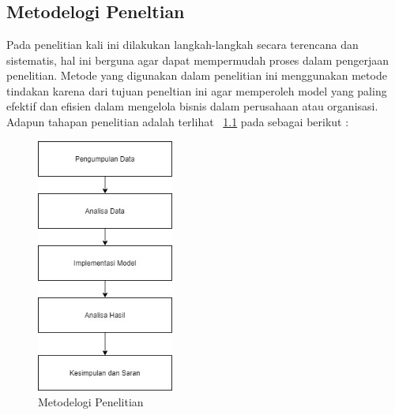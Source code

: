 \chapter{\babTiga}


\section{Metodelogi Peneltian}

Pada penelitian kali ini dilakukan langkah-langkah secara terencana dan sistematis, hal ini berguna agar dapat mempermudah proses dalam pengerjaan penelitian. Metode yang digunakan dalam penelitian ini menggunakan metode tindakan karena dari tujuan peneltian ini agar memperoleh model \scm yang paling efektif dan efisien dalam mengelola bisnis dalam perusahaan atau organisasi. Adapun tahapan penelitian adalah terlihat \pic~\ref{fig:alurPenelitian} pada sebagai berikut :
\begin{figure}
	\centering
	\includegraphics[width=0.40\textwidth]
		{pics/alur-penelitian.jpg}
	\caption{Metodelogi Penelitian}
	\label{fig:alurPenelitian}
\end{figure}


